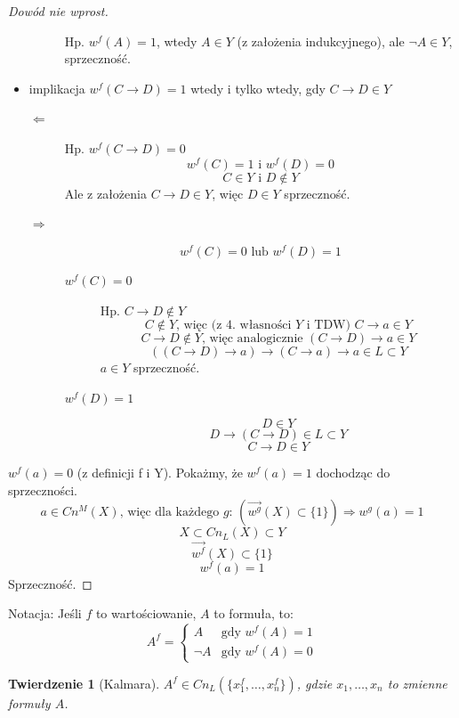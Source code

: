 \documentclass[10pt,a4paper]{article}
\theoremstyle{plain}
\newtheorem{theorem}{Twierdzenie}
\theoremstyle{definition}
\newcommand{\impl}{\rightarrow}
\begin{document}
\begin{proof}[Dowód nie wprost]
\begin{itemize}
\begin{description}
			Hp. $w^f(A) = 1$, wtedy $A \in Y$ (z założenia indukcyjnego),
			ale $\neg A \in Y$, sprzeczność.
	\end{description}
\item implikacja $w^f(C \impl D) = 1$ wtedy i tylko wtedy, gdy $C \impl D \in Y$
	\begin{description}
		\item[$\Leftarrow$] Hp. $w^f(C \impl D) = 0$
			$$w^f(C) = 1 \text{ i } w^f(D) = 0$$
			$$C \in Y \text{ i } D \not\in Y$$
			Ale z założenia $C \impl D \in Y$, więc $D \in Y$ sprzeczność.
		\item[$\Rightarrow$] $$w^f(C) = 0 \text { lub } w^f(D) = 1$$
			\begin{description}
				\item[$w^f(C) = 0$] Hp. $C \impl D \not\in Y$
					$$C \not\in Y \text{, więc (z 4. własności $Y$ i TDW) }
					C \impl a \in Y$$
					$$C \impl D \not\in Y \text{, więc analogicznie }
					(C \impl D) \impl a \in Y$$
					$$((C \impl D) \impl a) \impl (C \impl a) \impl a \in L \subset Y$$
					$a \in Y$ sprzeczność.
				\item[$w^f(D) = 1$]
					$$D \in Y$$
					$$D \impl (C \impl D) \in L \subset Y$$
					$$C \impl D \in Y$$	
			\end{description}
	\end{description}
\end{itemize}
$w^f(a) = 0$ (z definicji f i Y).
Pokażmy, że $w^f(a) = 1$ dochodząc do sprzeczności.
$$a \in Cn^M(X) \text{, więc dla każdego $g$: }
(\overrightarrow{w^g}(X) \subset \{1\}) \Rightarrow w^g(a) = 1$$
$$X \subset Cn_L(X) \subset Y$$
$$\overrightarrow{w^f}(X) \subset \{1\}$$
$$w^f(a) = 1$$
Sprzeczność.
\end{proof}

Notacja: 
Jeśli $f$ to wartościowanie, $A$ to formuła, to:
$$A^f =
	\begin{cases}
		A & \mbox{gdy } w^f(A) = 1 \\
		\neg A & \mbox{gdy } w^f(A) = 0 
	\end{cases}
$$

\begin{theorem}[Kalmara]
$A^f \in Cn_L(\{x_1^f, \dots, x_n^f\})$,
gdzie $x_1, \dots, x_n$ to zmienne formuły $A$.
\end{theorem}
\end{document}
